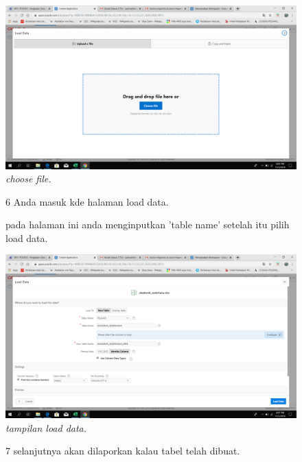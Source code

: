\begin{enumerate}
\begin{figure}
    \begin{center}
\includegraphics[scale=0.2]{figures/ss3.png}
    \caption{\textit{choose file.}}
        \end{center}

\label{gambar}
\end{figure}

\begin{figure}
\item[6] Anda masuk kde halaman load data.

pada halaman ini anda menginputkan 'table name' setelah itu pilih load data.

    \begin{center}
\includegraphics[scale=0.2]{figures/ss5.png}
    \caption{\textit{tampilan load data.}}
        \end{center}

\label{gambar}
\end{figure}

\begin{figure}
\item[7] selanjutnya akan dilaporkan kalau tabel telah dibuat.


\end{figure}
\end{enumerate}
